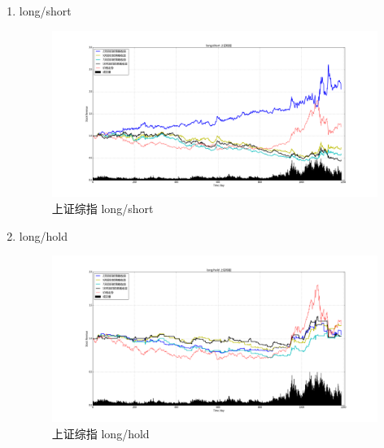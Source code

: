 \documentclass[12pt,a4paper]{article}
\begin{document}
\begin{enumerate}
\item long/short 
\begin{figure}[H]
	\centering
	\includegraphics[width=1.0\textwidth]{img_r_5/szzz.png}
	\caption{上证综指 long/short}
\end{figure}
\item long/hold 
\begin{figure}[H]
	\centering
	\includegraphics[width=1.0\textwidth]{img_r_5/szzz_1.png}
	\caption{上证综指 long/hold}
\end{figure}
\end{enumerate}
\end{document}
